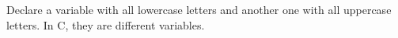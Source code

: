 
Declare a variable with all lowercase letters and another one with all uppercase letters.
In C, they are different variables.
